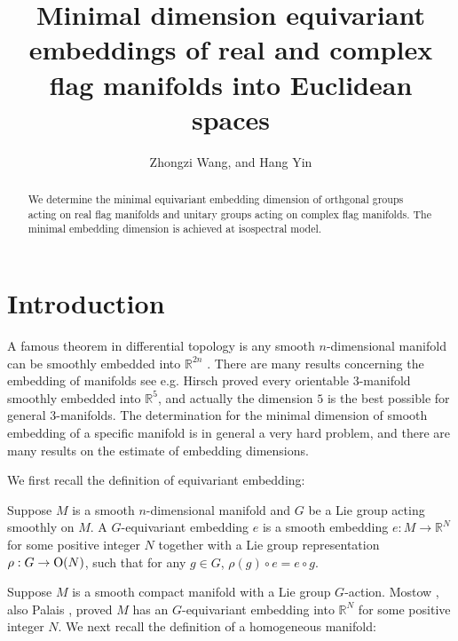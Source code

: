 \documentclass[a4paper]{amsart}
\theoremstyle{plain}
\theoremstyle{remark} \newtheorem{remark}[thm]{Remark}
\theoremstyle{remark} \newtheorem{exercise}{Exercise}
\theoremstyle{remark} \newtheorem{example}{Example}
\numberwithin{equation}{section}
\begin{document}
\title{Minimal dimension equivariant embeddings of real and complex flag manifolds into Euclidean spaces}
\author{Zhongzi Wang, and Hang Yin}
\begin{abstract}
    We determine the minimal equivariant embedding dimension of orthgonal groups acting on real flag manifolds and unitary groups acting on complex flag manifolds. The minimal embedding dimension is achieved at isospectral model.
\end{abstract}
\maketitle



\section{Introduction}






A famous theorem in differential topology is any smooth $n$-dimensional manifold can be smoothly embedded into $\mathbb{R}^{2n}$ \cite{Wh44}.  There are many results concerning the embedding of manifolds see e.g. Hirsch \cite{Hi61} proved every orientable $3$-manifold smoothly embedded into $\mathbb{R}^5$, and actually the dimension $5$ is the best possible for general 3-manifolds.  %
The determination for the minimal dimension of smooth embedding of a specific manifold is in general a very hard problem, %
and there are many results on the estimate of embedding dimensions.

We first recall the definition of equivariant embedding:

\begin{defn} Suppose $M$ is a smooth $n$-dimensional manifold and $G$ be a Lie group acting smoothly on $M$. A $G$-equivariant embedding $e$ is a smooth embedding $e: M\to \mathbb{R}^N$ for some positive integer $N$ together with a Lie group representation $\rho: G\to {\rm O}(N)$, such that for any $g\in G$, $\rho(g)\circ e=e\circ g$.
\end{defn}
Suppose $M$ is a smooth compact manifold with a Lie group $G$-action. Mostow \cite{Mos57}, also Palais \cite{Pal57}, proved $M$ has an $G$-equivariant embedding into $\mathbb{R}^{N}$ for some positive integer $N$. 
We next recall the definition of a homogeneous manifold:
\end{document}
